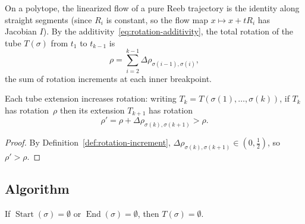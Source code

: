 \begin{remark}\label{rem:rotation-polytope}
On a polytope, the linearized flow of a pure Reeb trajectory
is the identity along straight segments
(since $R_i$ is constant, so the flow map $x \mapsto x + t R_i$ has Jacobian $I$).
By the additivity~\eqref{eq:rotation-additivity},
the total rotation of the tube $T(\sigma)$ from $t_1$ to $t_{k-1}$ is
\[
  \rho = \sum_{i=2}^{k-1} \Delta\rho_{\sigma(i-1),\sigma(i)},
\]
the sum of rotation increments at each inner breakpoint.
\end{remark}

\begin{lemma}\label{lem:rotation-monotone}
Each tube extension increases rotation:
writing $T_k = T(\sigma(1), \ldots, \sigma(k))$, if $T_k$
has rotation~$\rho$ then its extension $T_{k+1}$ has rotation
\[
  \rho' = \rho + \Delta\rho_{\sigma(k),\sigma(k+1)} > \rho.
\]
\end{lemma}

\begin{proof}
By Definition~\ref{def:rotation-increment},
$\Delta\rho_{\sigma(k),\sigma(k+1)} \in (0, \tfrac{1}{2})$,
so $\rho' > \rho$.
\end{proof}

\subsection{Algorithm}\label{subsec:tube-algorithm-main}

\begin{lemma}\label{lem:prune-empty}
If $\operatorname{Start}(\sigma) = \emptyset$ or $\operatorname{End}(\sigma) = \emptyset$,
then $T(\sigma) = \emptyset$.
\end{lemma}

